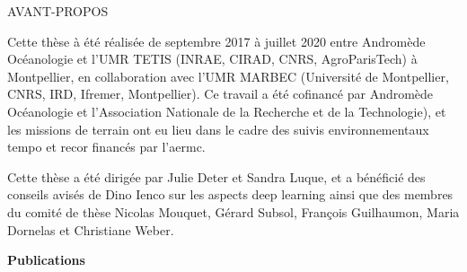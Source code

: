 {}
{\centerline { {\sffamily \Large AVANT-PROPOS}}}

\vspace*{1cm}
\vskip 0.5cm
\noindent

\normalsize
\noindent Cette thèse à été réalisée de septembre 2017 à juillet 2020 entre Andromède Océanologie et l'UMR TETIS (INRAE, CIRAD, CNRS, AgroParisTech) à Montpellier, en collaboration avec l'UMR MARBEC (Université de Montpellier, CNRS, IRD, Ifremer, Montpellier). Ce travail a été cofinancé par Andromède Océanologie et l'Association Nationale de la Recherche et de la Technologie), et les missions de terrain ont eu lieu dans le cadre des suivis environnementaux \acrshort{tempo} et \acrshort{recor} financés par l'\gls{aermc}.

\medskip

\noindent Cette thèse a été dirigée par Julie Deter et Sandra Luque, et a bénéficié des conseils avisés de Dino Ienco sur les aspects deep learning ainsi que des membres du comité de thèse Nicolas Mouquet, Gérard Subsol, François Guilhaumon, Maria Dornelas et Christiane Weber. 

\bigskip
\bigskip

\centerline{\textbf{\Large Publications}}

\medskip


\medskip


\medskip


\bigskip
\bigskip

